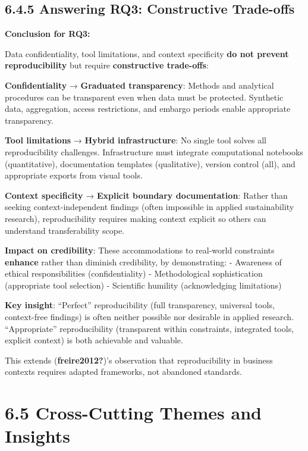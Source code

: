 \documentclass[
  oneside,
  open=any]{scrbook}
\begin{document}
\subsection{6.4.5 Answering RQ3: Constructive
Trade-offs}\label{answering-rq3-constructive-trade-offs}

\textbf{Conclusion for RQ3:}

Data confidentiality, tool limitations, and context specificity
\textbf{do not prevent reproducibility} but require \textbf{constructive
trade-offs}:

\textbf{Confidentiality} → \textbf{Graduated transparency}: Methods and
analytical procedures can be transparent even when data must be
protected. Synthetic data, aggregation, access restrictions, and embargo
periods enable appropriate transparency.

\textbf{Tool limitations} → \textbf{Hybrid infrastructure}: No single
tool solves all reproducibility challenges. Infrastructure must
integrate computational notebooks (quantitative), documentation
templates (qualitative), version control (all), and appropriate exports
from visual tools.

\textbf{Context specificity} → \textbf{Explicit boundary documentation}:
Rather than seeking context-independent findings (often impossible in
applied sustainability research), reproducibility requires making
context explicit so others can understand transferability scope.

\textbf{Impact on credibility}: These accommodations to real-world
constraints \textbf{enhance} rather than diminish credibility, by
demonstrating: - Awareness of ethical responsibilities (confidentiality)
- Methodological sophistication (appropriate tool selection) -
Scientific humility (acknowledging limitations)

\textbf{Key insight}: ``Perfect'' reproducibility (full transparency,
universal tools, context-free findings) is often neither possible nor
desirable in applied research. ``Appropriate'' reproducibility
(transparent within constraints, integrated tools, explicit context) is
both achievable and valuable.

This extends (\textbf{freire2012?})'s observation that reproducibility
in business contexts requires adapted frameworks, not abandoned
standards.

\section{6.5 Cross-Cutting Themes and
Insights}\label{cross-cutting-themes-and-insights}
\end{document}
